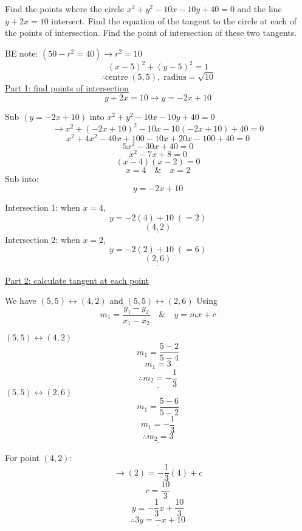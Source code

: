 \hlquestion Find the points where the circle 
$x^{2} + y^{2} - 10x - 10y + 40 = 0$ 
and the line 
$y + 2x = 10$
intersect. 
Find the equation of the tangent to the circle at each of the points 
of intersection. Find the point of intersection of these two tangents.

\begin{solution}
	BE note: $(50 - r^{2} = 40) \rightarrow r^{2} = 10$
	\[
		(x-5)^{2} + (y-5)^{2} = 1
	\]
	\[
		\therefore
		\text{centre} \; 
		(5, 5)
		,\; \text{radius} = 
		\sqrt{10}
	\]
	\underline{Part 1: find points of intersection}
	\[ 
		y + 2x = 10
		\rightarrow
		y = -2x + 10
	\]
	\par
	Sub $(y = -2x + 10)$ into $x^{2} + y^{2} - 10x - 10y + 40 = 0$
	\[
		\rightarrow
		x^{2} + (-2x+10)^{2} - 10x - 10(-2x + 10) + 40 = 0
	\]
	\[
		x^{2} + 4x^{2} - 40x + 100 - 10x + 20 x - 100 + 40 = 0
	\]
	\[
		5x^{2} - 30x + 40 = 0
	\]
	\[
		x^{2} - 7x + 8 = 0
	\]
	\[
		(x-4)(x-2) = 0
	\]
	\[
		x = 4 
		\quad \& \quad
		x = 2
	\]
	Sub into: 
	\[
		y = -2x + 10	
	\]
	\begin{multicols}{2}
		Intersection 1: when $x=4$,
		\[
			y = -2(4) + 10
			\; 
			(= 2)
		\]
		\[
			\underline{
				(4, 2)
				}
		\]
		Intersection 2: when $x=2$,
		\[
			y = -2(2) + 10
			\; 
			(= 6)
		\]
		\[
			\underline{
				(2, 6)
			}
		\]		
	\end{multicols}
	\underline{Part 2: calculate tangent at each point}
	\par
	We have 
	$(5, 5) \leftrightarrow (4, 2)$ 
	and 
	$(5, 5) \leftrightarrow (2, 6)$
	\newline
	Using
	\[
		m_{1} = \frac{y_{1}-y_{2}}{x_{1}-x_{2}}
		\quad \& \quad
		y = mx + c
	\]
	\begin{multicols}{2}
		$(5, 5) \leftrightarrow (4, 2)$ 
		\[
			m_{1} = \frac{5-2}{5-4}
		\]
		\[
			m_{1} = 3
		\]
		\[
			\underline{
				\therefore
				m_{2} = -\frac{1}{3}
			}	
		\]
		$(5, 5) \leftrightarrow (2, 6)$ 
		\[
			m_{1} = \frac{5-6}{5-2}
		\]
		\[
			m_{1} = -\frac{1}{3}
		\]
		\[
			\underline{
				\therefore
				m_{2} = 3
			}	
		\]
	\end{multicols}
	\begin{multicols}{2}
		For point $(4, 2)$:
		\[
			\rightarrow
			(2) = -\frac{1}{3} (4) + c
		\]
		\[
			c = \frac{10}{3}
		\]
		\[
			y = -\frac{1}{3}x + \frac{10}{3}
		\]
		\begin{equation}
			\underline{
				\therefore
				3y = -x + 10
			}
			\label{eq:M8_circ_q06_tangent_at_point_x4_y2}

\end{equation}
\end{multicols}
\end{solution}
